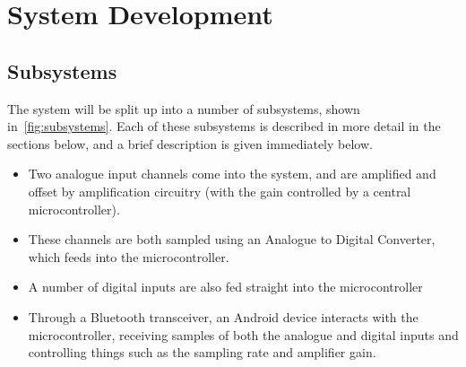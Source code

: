 \chapter{System Development}
\section{Subsystems}
\label{sec:subsystems}

The system will be split up into a number of subsystems, shown
in~\cref{fig:subsystems}. Each of these subsystems is described in more detail
in the sections below, and a brief description is given immediately below.

\begin{itemize}

  \item Two analogue input channels come into the system, and are amplified and
  offset by amplification circuitry (with the gain controlled by a central
  microcontroller).

  \item These channels are both sampled using an Analogue to Digital Converter,
  which feeds into the microcontroller.

  \item A number of digital inputs are also fed straight into the
  microcontroller

  \item Through a Bluetooth transceiver, an Android device interacts with the
  microcontroller, receiving samples of both the analogue and digital inputs and
  controlling things such as the sampling rate and amplifier gain.

\end{itemize}

